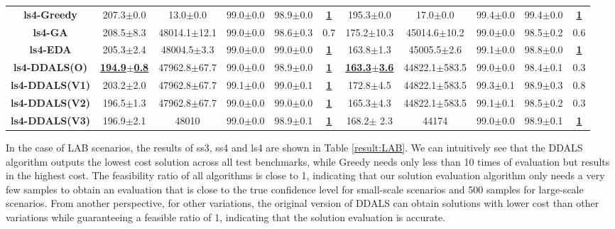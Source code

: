 \documentclass[lettersize,journal]{IEEEtran}
\begin{document}
\begin{table}[!t]
{\begin{tabular}{ccccccccccc}
        \midrule
        {\bfseries ls4-Greedy} &207.3$\pm$0.0&13.0$\pm$0.0 & 99.0$\pm$0.0&98.9$\pm$0.0 &\underline{\bfseries 1} &195.3$\pm$0.0&17.0$\pm$0.0& 99.4$\pm$0.0&99.4$\pm$0.0  &\underline{\bfseries 1} \\
        {\bfseries ls4-GA} &208.5$\pm$8.3&48014.1$\pm$12.1 & 99.0$\pm$0.0&98.6$\pm$0.3&0.7&175.2$\pm$10.3&45014.6$\pm$10.2& 99.0$\pm$0.0&98.5$\pm$0.2  &0.6 \\
        {\bfseries ls4-EDA} &205.3$\pm$2.4&48004.5$\pm$3.3 & 99.0$\pm$0.0&99.0$\pm$0.0 &\underline{\bfseries 1} &163.8$\pm$1.3&45005.5$\pm$2.6& 99.1$\pm$0.0&98.8$\pm$0.0  &\underline{\bfseries 1} \\
        {\bfseries ls4-DDALS(O)} &\underline{\bfseries 194.9$\pm$0.8} &47962.8$\pm$67.7 & 99.0$\pm$0.0&98.9$\pm$0.0 &\underline{\bfseries 1} &\underline{\bfseries 163.3$\pm$3.6} &44822.1$\pm$583.5& 99.0$\pm$0.0&98.4$\pm$0.1  &0.3 \\
        {\bfseries ls4-DDALS(V1)} &203.2$\pm$2.0&47962.8$\pm$67.7 & 99.1$\pm$0.0&99.0$\pm$0.1 &\underline{\bfseries 1} &172.8$\pm$4.5&44822.1$\pm$583.5& 99.3$\pm$0.1&98.9$\pm$0.3  &0.8 \\
        {\bfseries ls4-DDALS(V2)} &196.5$\pm$1.3&47962.8$\pm$67.7 & 99.0$\pm$0.0&99.0$\pm$0.0 &\underline{\bfseries 1} &165.3$\pm$4.3&44822.1$\pm$583.5& 99.1$\pm$0.1&98.5$\pm$0.2  &0.3 \\
        {\bfseries ls4-DDALS(V3)} &196.9$\pm$2.1&48010 & 99.0$\pm$0.0&98.9$\pm$0.1 &\underline{\bfseries 1} &168.2$\pm$ 2.3&44174& 99.0$\pm$0.0&98.9$\pm$0.1  &\underline{\bfseries 1} \\
        
        \bottomrule
        \end{tabular}
    }
    \label{result:APP}
\end{table}

In the case of LAB scenarios, the results of ss3, ss4 and ls4 are shown in Table \ref{result:LAB}. 
We can intuitively see that the DDALS algorithm outputs the lowest cost solution across all test benchmarks, while Greedy needs only less than 10 times of evaluation but results in the highest cost. 
The feasibility ratio of all algorithms is close to 1, indicating that our solution evaluation algorithm only needs a very few samples to obtain an evaluation that is close to the true confidence level for small-scale scenarios and 500 samples for large-scale scenarios.
From another perspective, for other variations, the original version of DDALS can obtain solutions with lower cost than other variations while guaranteeing a feasible ratio of 1, indicating that the solution evaluation is accurate. 
\end{document}
